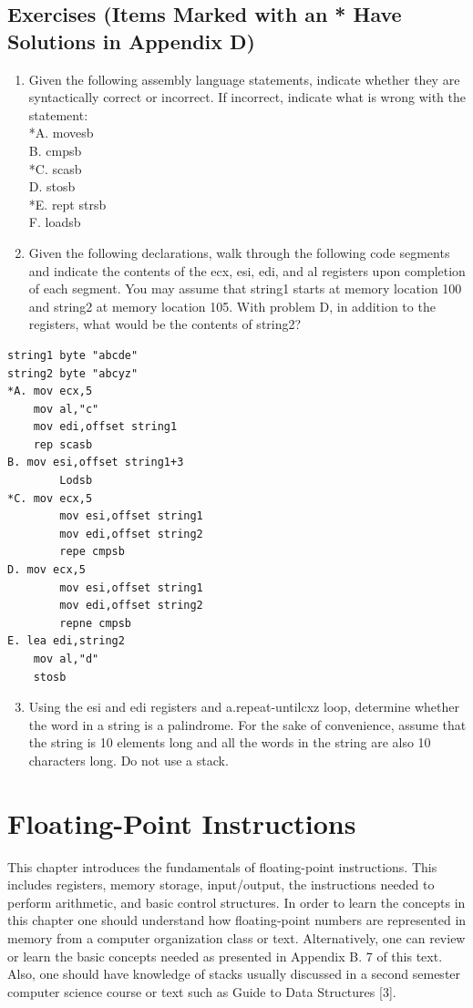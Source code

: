 \documentclass[10pt]{book}
\begin{document}
\subsection{Exercises (Items Marked with an * Have Solutions in Appendix D)}
\begin{enumerate}
  \item Given the following assembly language statements, indicate whether they are syntactically correct or incorrect. If incorrect, indicate what is wrong with the statement:\\
*A. movesb\\
B. cmpsb\\
*C. scasb\\
D. stosb\\
*E. rept strsb\\
F. loadsb
  \item Given the following declarations, walk through the following code segments and indicate the contents of the ecx, esi, edi, and al registers upon completion of each segment. You may assume that string1 starts at memory location 100 and string2 at memory location 105. With problem D, in addition to the registers, what would be the contents of string2?
\end{enumerate}

\begin{verbatim}
string1 byte "abcde"
string2 byte "abcyz"
*A. mov ecx,5
    mov al,"c"
    mov edi,offset string1
    rep scasb
B. mov esi,offset string1+3
        Lodsb
*C. mov ecx,5
        mov esi,offset string1
        mov edi,offset string2
        repe cmpsb
D. mov ecx,5
        mov esi,offset string1
        mov edi,offset string2
        repne cmpsb
E. lea edi,string2
    mov al,"d"
    stosb
\end{verbatim}

\begin{enumerate}
  \setcounter{enumi}{2}
  \item Using the esi and edi registers and a.repeat-untilcxz loop, determine whether the word in a string is a palindrome. For the sake of convenience, assume that the string is 10 elements long and all the words in the string are also 10 characters long. Do not use a stack.
\end{enumerate}
\section{Floating-Point Instructions}
This chapter introduces the fundamentals of floating-point instructions. This includes registers, memory storage, input/output, the instructions needed to perform arithmetic, and basic control structures. In order to learn the concepts in this chapter one should understand how floating-point numbers are represented in memory from a computer organization class or text. Alternatively, one can review or learn the basic concepts needed as presented in Appendix B. 7 of this text. Also, one should have knowledge of stacks usually discussed in a second semester computer science course or text such as Guide to Data Structures [3].
\end{document}
